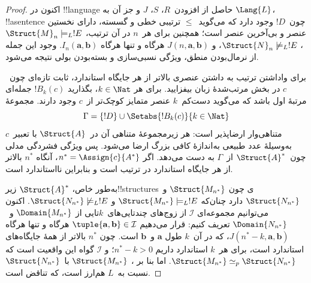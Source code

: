 \documentclass[../../../include/open-logic-section]{subfiles}
\begin{document}
\begin{proof}
اکنون در !!{language} حاصل از افزودن~$R$، $S$، $J$ و جز آن به
$\Lang{L}$، !!a{sentence} چون~$!D$ وجود دارد که می‌گوید~$\le$ ترتیبی
خطی و گسسته، دارای نخستین عنصر و بی‌آخرین عنصر است؛ همچنین برای هر~$n$
در آن ترتیب، $\Struct{M}_n \models_L !E$،
$\Struct{N}_n \not\models_L !E$، و
$J(n, \mathbf{a}, \mathbf{b})$ هرگاه و تنها هرگاه
$I_n(\mathbf{a}, \mathbf{b})$. وجود این جمله از نرمال‌بودن
منطق، ویژگی نسبی‌سازی و بسته‌بودن بولی نتیجه می‌شود.

برای واداشتن ترتیب به داشتن عنصری بالاتر از هر جایگاه استاندارد، ثابت
تازه‌ای چون~$c$ در بخش مرتب‌شدهٔ زبان بیفزایید. برای هر
$k \in \Nat$، بگذارید $!B_k(c)$ جمله‌ای مرتبهٔ اول باشد که
می‌گوید دست‌کم~$k$ عنصر متمایز کوچک‌تر از~$c$ وجود دارند. مجموعهٔ
\[
\Gamma = \{!D\} \cup \Setabs{!B_k(c)}{k \in \Nat}
\]
متناهی‌وار ارضاپذیر است: هر زیرمجموعهٔ متناهی آن در~$\Struct{A}$ با
تعبیر~$c$ به‌وسیلهٔ عدد طبیعی به‌اندازهٔ کافی بزرگ ارضا می‌شود. پس
ویژگی فشردگی مدلی چون~$\Struct{A}^*$ از~$\Gamma$ به دست می‌دهد. اگر
$n^*=\Assign{c}{A^*}$، آنگاه $n^*$ بالاتر از هر جایگاه استاندارد در
ترتیب است و بنابراین نااستاندارد است.

به‌طور خاص، $\Struct{A}^*$ زیر!!{structure}sی چون
$\Struct{M_{n^*}}$ و~$\Struct{N_{n^*}}$ دارد چنان‌که
$\Struct{M_{n^*}} \models_L !E$ و
$\Struct{N_{n^*}} \not\models_L !E$. اکنون می‌توانیم مجموعه‌ای
$\mathcal{I}$ از زوج‌های چندتایی‌های~$k$تایی از
$\Domain{M_{n^*}}$ و~$\Domain{N_{n^*}}$ تعریف کنیم: قرار می‌دهیم
$\tuple{\mathbf{a}, \mathbf{b}} \in \mathcal{I}$ هرگاه و تنها هرگاه
$J(n^*-k, \mathbf{a}, \mathbf{b})$، که در آن~$k$ طول
$\mathbf{a}$ و~$\mathbf{b}$ است. چون $n^*$ بالاتر از همهٔ جایگاه‌های
استاندارد است، برای هر~$k$ استاندارد داریم $n^* - k >0$؛ و
$\mathcal{I}$ گواه این واقعیت است که
$\Struct{M_{n^*}} \simeq_p \Struct{N_{n^*}}$. اما بنا بر
،
$\Struct{M_{n^*}}$ با~$\Struct{N_{n^*}}$ نسبت به~$L$ هم‌ارز است، که
تناقض است.
\end{proof}
\end{document}
